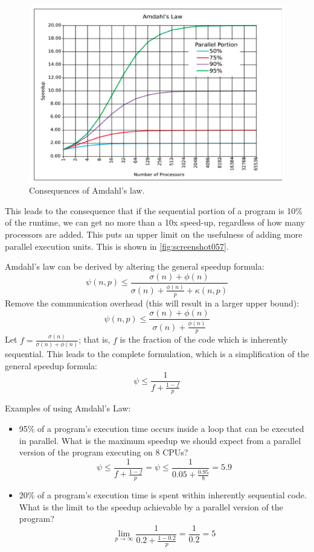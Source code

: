 \begin{figure}
\centering
\includegraphics[width=0.7\linewidth]{figures/screenshot057}
\caption{Consequences of Amdahl's law.}
\label{fig:screenshot057}
\end{figure}

This leads to the consequence that if the sequential portion of a program is 10\% of the runtime, we can get no more than a 10x speed-up, regardless of how many processors are added. This puts an upper limit on the usefulness of adding more parallel execution units.  This is shown in \autoref{fig:screenshot057}.

Amdahl's law can be derived by altering the general speedup formula:
\[ \psi(n,p) \le \frac{\sigma(n) + \phi(n)}{\sigma(n) + \frac{\phi(n)}{p} + \kappa(n, p)} \]
Remove the communication overhead (this will result in a larger upper bound):
\[ \psi(n,p) \le \frac{\sigma(n) + \phi(n)}{\sigma(n) + \frac{\phi(n)}{p}} \]
Let $f = \frac{\sigma(n)}{\sigma(n) + \phi(n)}$; that is, $f$ is the fraction of the code which is inherently sequential. This leads to the complete formulation, which is a simplification of the general speedup formula:
\[ \psi \le \frac{1}{f + \frac{1-f}{p}} \]

Examples of using Amdahl's Law: \begin{itemize}
\item 95\% of a program’s execution time occurs inside a loop that can be executed in parallel. What is the maximum speedup we should expect from a parallel version of the program executing on 8 CPUs? 
\[ \psi \le \frac{1}{f + \frac{1-f}{p}} = \psi \le \frac{1}{0.05 + \frac{0.95}{8}} = 5.9 \]
\item 20\% of a program’s execution time is spent within inherently sequential code. What is the limit to the speedup achievable by a parallel version of the program?
\[ \lim_{p\rightarrow\infty} \frac{1}{0.2 + \frac{1-0.2}{p}} = \frac{1}{0.2} = 5 \]
\end{itemize}

